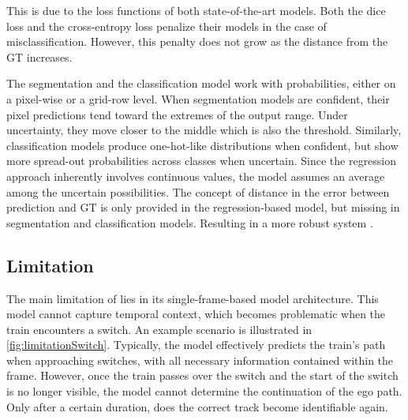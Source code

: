 This is due to the loss functions of both state-of-the-art models.
Both the dice loss and the cross-entropy loss penalize their models in the case of misclassification.
However, this penalty does not grow as the distance from the \ac{GT} increases.

The segmentation and the classification model work with probabilities, either on a pixel-wise or a grid-row level.
When segmentation models are confident, their pixel predictions tend toward the extremes of the output range.
Under uncertainty, they move closer to the middle which is also the threshold.
Similarly, classification models produce one-hot-like distributions when confident, but show more spread-out probabilities across classes when uncertain.
Since the regression approach inherently involves continuous values, the model assumes an average among the uncertain possibilities.
The concept of distance in the error between prediction and \ac{GT} is only provided in the regression-based model, but missing in segmentation and classification models.
Resulting in a more robust system \cite{tepNet2024}.

\subsection{Limitation}

The main limitation of \cite{tepNet2024} lies in its single-frame-based model architecture.
This model cannot capture temporal context, which becomes problematic when the train encounters a switch.
An example scenario is illustrated in \autoref{fig:limitationSwitch}.
Typically, the model effectively predicts the train's path when approaching switches, with all necessary information contained within the frame.
However, once the train passes over the switch and the start of the switch is no longer visible, the model cannot determine the continuation of the ego path.
Only after a certain duration, does the correct track become identifiable again.

